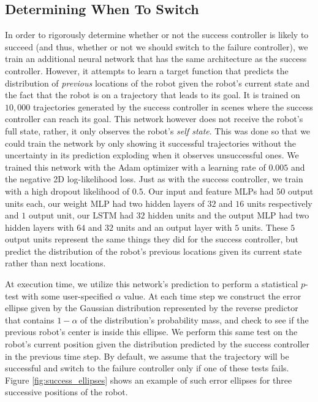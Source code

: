 \documentclass[letterpaper, 10 pt, conference]{ieeeconf}  %
\begin{document}
	\subsection{Determining When To Switch}
		In order to rigorously determine whether or not the success controller is likely to succeed (and thus, whether or not we should switch to the failure controller), we train an additional neural network that has the same architecture as the success controller. However, it attempts to learn a target function that predicts the distribution of \textit{previous} locations of the robot given the robot's current state and the fact that the robot is on a trajectory that leads to its goal. It is trained on $10,000$ trajectories generated by the success controller in scenes where the success controller can reach its goal. This network however does not receive the robot's full state, rather, it only observes the robot's \textit{self state}. This was done so that we could train the network by only showing it successful trajectories without the uncertainty in its prediction exploding when it observes unsuccessful ones. We trained this network with the Adam optimizer with a learning rate of $0.005$ and the negative 2D log-likelihood loss. Just as with the success controller, we train with a high dropout likelihood of $0.5$. Our input and feature MLPs had $50$ output units each, our weight MLP had two hidden layers of $32$ and $16$ units respectively and $1$ output unit, our LSTM had $32$ hidden units and the output MLP had two hidden layers with $64$ and $32$ units and an output layer with $5$ units. These $5$ output units represent the same things they did for the success controller, but predict the distribution of the robot's previous locations given its current state rather than next locations.
		
		At execution time, we utilize this network's prediction to perform a statistical $p$-test with some user-specified $\alpha$ value. At each time step we construct the error ellipse given by the Gaussian distribution represented by the reverse predictor that contains $1-\alpha$ of the distribution's probability mass, and check to see if the previous robot's center is inside this ellipse. We perform this same test on the robot's current position given the distribution predicted by the success controller in the previous time step. By default, we assume that the trajectory will be successful and switch to the failure controller only if one of these tests fails. Figure \ref{fig:success_ellipses} shows an example of such error ellipses for three successive positions of the robot.
		
\end{document}
